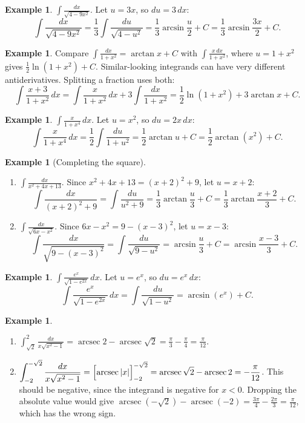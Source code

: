 \documentclass[12pt,letterpaper]{article}
\theoremstyle{definition}
\newtheorem{example}[theorem]{Example}
\DeclareMathOperator{\arcsec}{arcsec}
\begin{document}
\begin{example}
  $\displaystyle\int\frac{dx}{\sqrt{4-9x^2}}$. Let $u=3x$, so $du=3\,dx$:
  \[
    \int\frac{dx}{\sqrt{4-9x^2}}=\frac13\int\frac{du}{\sqrt{4-u^2}}
      =\frac13\arcsin\frac u2+C=\frac13\arcsin\frac{3x}{2}+C.
  \]
\end{example}

\begin{example}
  Compare $\displaystyle\int\frac{dx}{1+x^2}=\arctan x+C$ with
  $\displaystyle\int\frac{x\,dx}{1+x^2}$, where $u=1+x^2$ gives
  $\frac12\ln(1+x^2)+C$. Similar-looking integrands can have very different
  antiderivatives. Splitting a fraction uses both:
  \[
    \int\frac{x+3}{1+x^2}\,dx=\int\frac{x}{1+x^2}\,dx+3\int\frac{dx}{1+x^2}
      =\frac12\ln(1+x^2)+3\arctan x+C.
  \]
\end{example}

\begin{example}
  $\displaystyle\int\frac{x}{1+x^4}\,dx$. Let $u=x^2$, so $du=2x\,dx$:
  \[
    \int\frac{x}{1+x^4}\,dx=\frac12\int\frac{du}{1+u^2}
      =\frac12\arctan u+C=\frac12\arctan(x^2)+C.
  \]
\end{example}

\begin{example}[Completing the square]
  \begin{enumerate}[label=(\alph*)]
    \item $\displaystyle\int\frac{dx}{x^2+4x+13}$. Since
      $x^2+4x+13=(x+2)^2+9$, let $u=x+2$:
      \[
        \int\frac{dx}{(x+2)^2+9}=\int\frac{du}{u^2+9}
          =\frac13\arctan\frac u3+C=\frac13\arctan\frac{x+2}{3}+C.
      \]
    \item $\displaystyle\int\frac{dx}{\sqrt{6x-x^2}}$. Since
      $6x-x^2=9-(x-3)^2$, let $u=x-3$:
      \[
        \int\frac{dx}{\sqrt{9-(x-3)^2}}=\int\frac{du}{\sqrt{9-u^2}}
          =\arcsin\frac u3+C=\arcsin\frac{x-3}{3}+C.
      \]
  \end{enumerate}
\end{example}

\begin{example}
  $\displaystyle\int\frac{e^x}{\sqrt{1-e^{2x}}}\,dx$. Let $u=e^x$, so
  $du=e^x\,dx$:
  \[
    \int\frac{e^x}{\sqrt{1-e^{2x}}}\,dx=\int\frac{du}{\sqrt{1-u^2}}
      =\arcsin(e^x)+C.
  \]
\end{example}

\begin{example}
  \begin{enumerate}[label=(\alph*)]
    \item $\displaystyle\int_{\sqrt2}^{2}\frac{dx}{x\sqrt{x^2-1}}
      =\arcsec2-\arcsec\sqrt2=\frac\pi3-\frac\pi4=\frac{\pi}{12}$.
    \item $\displaystyle\int_{-2}^{-\sqrt2}\frac{dx}{x\sqrt{x^2-1}}
      =\Bigl[\arcsec|x|\Bigr]_{-2}^{-\sqrt2}
      =\arcsec\sqrt2-\arcsec2=-\frac{\pi}{12}$.
      This should be negative, since the integrand is negative for $x<0$.
      Dropping the absolute value would give
      $\arcsec(-\sqrt2)-\arcsec(-2)=\frac{3\pi}{4}-\frac{2\pi}{3}
      =\frac{\pi}{12}$, which has the wrong sign.
  \end{enumerate}
\end{example}
\end{document}
